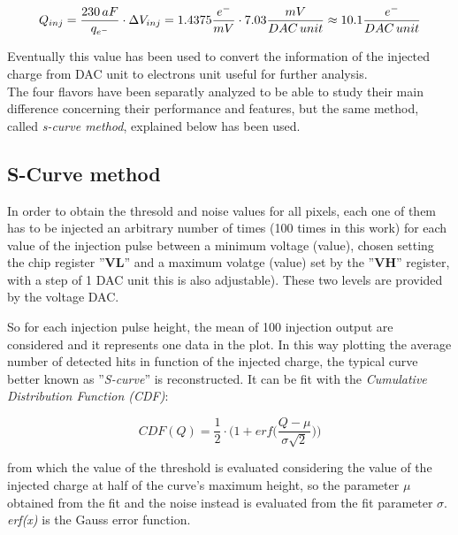 \begin{equation}
\small
Q_{inj} = \frac{230 \, aF}{q_{{e}^{-}}} \cdot \Delta V_{inj} = 1.4375 \frac{e^{-}}{mV} \cdot 7.03 \frac{mV}{DAC \, unit} \approx 10.1 \frac{e^{-}}{DAC \, unit}  
\label{conversion_factor}
\end{equation}

Eventually this value has been used to convert the information of the injected charge from DAC unit to electrons unit useful for further analysis.
\\
The four flavors have been separatly analyzed to be able to study their main difference concerning their performance and features, but the same method, called \textit{s-curve method}, explained below has been used. 


\subsection{S-Curve method} \label{threshold_subsection}

In order to obtain the thresold and noise values for all pixels, each one of them has to be injected an arbitrary number of times (100 times in this work) for each value of the injection pulse between a minimum voltage (value), chosen setting the chip register ''\textbf{VL}'' and a maximum volatge (value) set by the ''\textbf{VH}'' register, with a step of 1 DAC unit this is also adjustable). These two levels are provided by the voltage DAC.

So for each injection pulse height, the mean of 100 injection output are considered and it represents one data in the plot.  In this way plotting the average number of detected hits in function of the injected charge, the typical curve better known as ''\textit{S-curve}'' is reconstructed. It can be fit with the \textit{Cumulative Distribution Function (CDF)}:

\begin{equation}
 CDF(Q) = \frac{1}{2} \cdot \bigg(1 + \textit{erf}\bigg(\frac{Q-\mu}{\sigma \sqrt{2}}\bigg)\bigg)
\end{equation}

from which the value of the threshold is evaluated considering the value of the injected charge at half of the curve's maximum height, so the parameter $\mu$ obtained from the fit and the noise instead is evaluated from the fit parameter $\sigma$. \textit{erf(x)} is the Gauss error function. 

